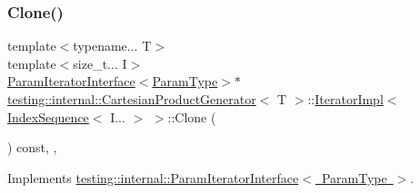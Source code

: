 \subsubsection{\texorpdfstring{Clone()}{Clone()}\hspace{0.1cm}{\footnotesize\ttfamily [2/2]}}
{\footnotesize\ttfamily template$<$typename... T$>$ \\
template$<$size\+\_\+t... I$>$ \\
\mbox{\hyperlink{classtesting_1_1internal_1_1_param_iterator_interface}{Param\+Iterator\+Interface}}$<$\mbox{\hyperlink{classtesting_1_1internal_1_1_cartesian_product_generator_af27131157a9347f0c82420ca081ee7dd}{Param\+Type}}$>$$\ast$ \mbox{\hyperlink{classtesting_1_1internal_1_1_cartesian_product_generator}{testing\+::internal\+::\+Cartesian\+Product\+Generator}}$<$ T $>$\+::\mbox{\hyperlink{classtesting_1_1internal_1_1_cartesian_product_generator_1_1_iterator_impl}{Iterator\+Impl}}$<$ \mbox{\hyperlink{structtesting_1_1internal_1_1_index_sequence}{Index\+Sequence}}$<$ I... $>$ $>$\+::Clone (\begin{DoxyParamCaption}{ }\end{DoxyParamCaption}) const\hspace{0.3cm}{\ttfamily [inline]}, {\ttfamily [override]}, {\ttfamily [virtual]}}



Implements \mbox{\hyperlink{classtesting_1_1internal_1_1_param_iterator_interface_a4998c23e27e2943d97546011aa35db80}{testing\+::internal\+::\+Param\+Iterator\+Interface$<$ Param\+Type $>$}}.

\mbox{\label{classtesting_1_1internal_1_1_cartesian_product_generator_1_1_iterator_impl_3_01_index_sequence_3_01_i_8_8_8_01_4_01_4_a0e6c088fed9a27254a657755d05bdcae}} 
